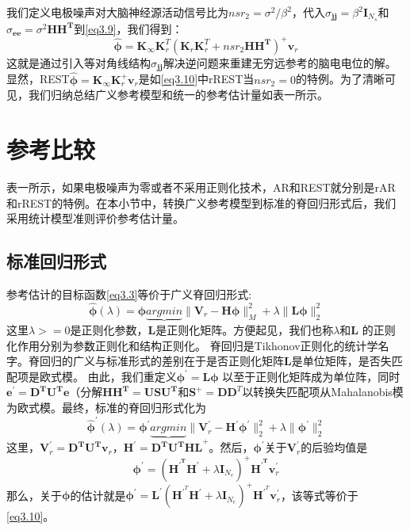 我们定义电极噪声对大脑神经源活动信号比为$nsr_{2}=\sigma^{2}/\beta^{2}$，代入$\sigma_{\mathbf{jj}}=\beta^{2}\mathbf{I}_{N_{s}}$和$\sigma_{\mathbf{ee}}=\sigma^{2}\mathbf{HH^{T}}$到\eqref{eq3.9}，我们得到：
\begin{equation}\label{eq3.10}
\hat{\mathbf{\phi}}=\mathbf{K}_{\infty}\mathbf{K}_{r}^{T}(\mathbf{K}_{r}\mathbf{K}_{r}^{T}+nsr_{2}\mathbf{HH^{T}})^{+}\mathbf{v}_{r}
\end{equation}
这就是通过引入等对角线结构$\sigma_{\mathbf{jj}}$解决逆问题来重建无穷远参考的脑电电位的解。显然，REST$\hat{\mathbf{\phi}}=\mathbf{K}_{\infty}\mathbf{K}_{r}^{+}\mathbf{v}_{r}$是如\eqref{eq3.10}中rREST当$nsr_{2}=0$的特例。为了清晰可见，我们归纳总结广义参考模型和统一的参考估计量如表一所示。

\section{参考比较}
表一所示，如果电极噪声为零或者不采用正则化技术，AR和REST就分别是rAR和rREST的特例。在本小节中，转换广义参考模型到标准的脊回归形式后，我们采用统计模型准则评价参考估计量。
\subsection{标准回归形式}
参考估计的目标函数\eqref{eq3.3}等价于广义脊回归形式:
\begin{equation}\label{eq3.11}
\hat{\mathbf{\phi}}(\lambda)=\mathbf{\phi}\underbrace{argmin}{\lVert\mathbf{V}_{r}-\mathbf{H\phi}\rVert_{M}^{2}+\lambda\lVert\mathbf{L\phi}\rVert_2^2}
\end{equation}
这里$\lambda>=0$是正则化参数，$\mathbf{L}$是正则化矩阵。方便起见，我们也称$\lambda$和$\mathbf{L}$ 的正则化作用分别为参数正则化和结构正则化。
脊回归是Tikhonov正则化的统计学名字。脊回归的广义与标准形式的差别在于是否正则化矩阵$\mathbf{L}$是单位矩阵，是否失匹配项是欧式模。 由此，我们重定义$\mathbf{\phi^\prime=L\phi}$ 以至于正则化矩阵成为单位阵，同时$\mathbf{e^\prime=D^{T}U^{T}e}$（分解$\mathbf{HH^{T}=USU^{T}}$和$\mathbf{S}^+=\mathbf{DD}^T$以转换失匹配项从Mahalanobis模为欧式模。最终，标准的脊回归形式化为
\begin{equation}\label{eq3.12}
\hat{\mathbf{\phi}}^\prime(\lambda)=\mathbf{\phi}^\prime\underbrace{argmin}{\lVert{\mathbf{V}_r^\prime-\mathbf{H^\prime\phi^\prime}}\rVert_2^2+\lambda\lVert{\mathbf{\phi}^\prime}\rVert_2^2}
\end{equation}
这里，$\mathbf{V}^\prime_r=\mathbf{D^TU^Tv}_r$，$\mathbf{H}^\prime=\mathbf{D^TU^THL}^+$。然后，$\mathbf{\phi}^\prime$关于$\mathbf{V}^\prime_r$的后验均值是
\begin{equation}\label{eq3.13}
\mathbf{\phi}^\prime=(\mathbf{H^{\prime^T}}\mathbf{H}^\prime+\lambda\mathbf{I}_{N_e})^+\mathbf{H^{\prime^T}}\mathbf{v}^\prime_r
\end{equation}
那么，关于$\mathbf{\phi}$的估计就是$
\mathbf{\phi}^\prime=\mathbf{L}^\prime(\mathbf{H}^{\prime^T}\mathbf{H}^\prime+\lambda\mathbf{I}_{N_e})^+\mathbf{H}^{\prime^T}\mathbf{v}^\prime_r$，该等式等价于\eqref{eq3.10}。
